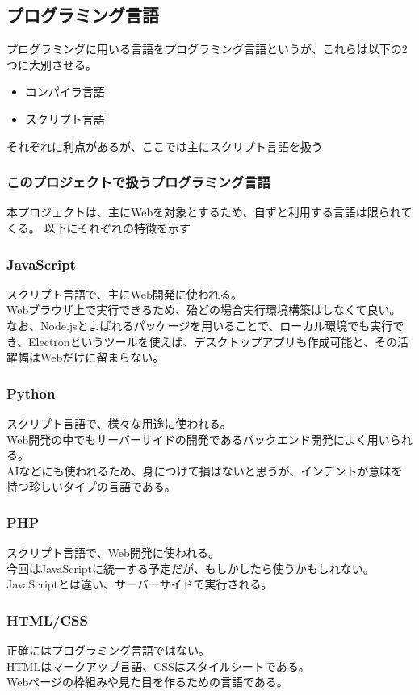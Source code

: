 \documentclass{ltjsarticle}
\begin{document}
\subsection{プログラミング言語}
プログラミングに用いる言語をプログラミング言語というが、これらは以下の2つに大別させる。
\begin{itemize}
    \item コンパイラ言語
    \item スクリプト言語
\end{itemize}
それぞれに利点があるが、ここでは主にスクリプト言語を扱う
\subsubsection{このプロジェクトで扱うプログラミング言語}
本プロジェクトは、主にWebを対象とするため、自ずと利用する言語は限られてくる。
以下にそれぞれの特徴を示す
\subsubsection{JavaScript}
スクリプト言語で、主にWeb開発に使われる。\\
Webブラウザ上で実行できるため、殆どの場合実行環境構築はしなくて良い。\\
なお、Node.jsとよばれるパッケージを用いることで、ローカル環境でも実行でき、Electronというツールを使えば、デスクトップアプリも作成可能と、その活躍幅はWebだけに留まらない。
\subsubsection{Python}
スクリプト言語で、様々な用途に使われる。\\
Web開発の中でもサーバーサイドの開発であるバックエンド開発によく用いられる。\\
AIなどにも使われるため、身につけて損はないと思うが、インデントが意味を持つ珍しいタイプの言語である。
\subsubsection{PHP}
スクリプト言語で、Web開発に使われる。\\
今回はJavaScriptに統一する予定だが、もしかしたら使うかもしれない。\\
JavaScriptとは違い、サーバーサイドで実行される。
\subsubsection{HTML/CSS}
正確にはプログラミング言語ではない。\\
HTMLはマークアップ言語、CSSはスタイルシートである。\\
Webページの枠組みや見た目を作るための言語である。
\end{document}
